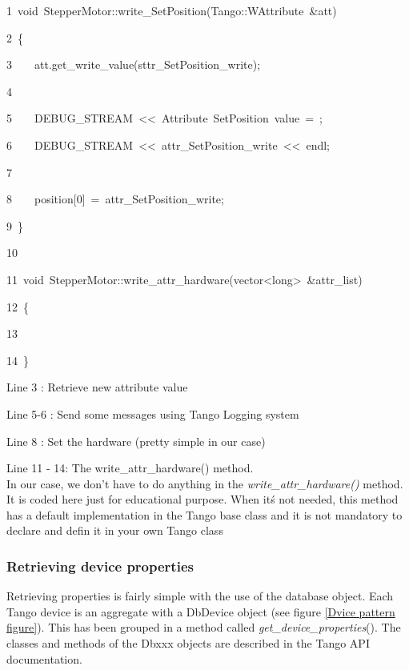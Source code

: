 
\begin{lyxcode}
1~void~StepperMotor::write\_SetPosition(Tango::WAttribute~\&att)

2~\{

3~~~~att.get\_write\_value(sttr\_SetPosition\_write);

4~

5~~~~DEBUG\_STREAM~<\textcompwordmark{}<~\textquotedbl{}Attribute~SetPosition~value~=~\textquotedbl{};

6~~~~DEBUG\_STREAM~<\textcompwordmark{}<~attr\_SetPosition\_write~<\textcompwordmark{}<~endl;

7~

8~~~~position{[}0{]}~=~attr\_SetPosition\_write;

9~\}

10~

11~void~StepperMotor::write\_attr\_hardware(vector<long>~\&attr\_list)

12~\{

13~

14~\}
\end{lyxcode}


Line 3 : Retrieve new attribute value

Line 5-6 : Send some messages using Tango Logging system

Line 8 : Set the hardware (pretty simple in our case)

Line 11 - 14: The write\_attr\_hardware() method. \\


In our case, we don't have to do anything in the \emph{write\_attr\_hardware()}
method. It is coded here just for educational purpose. When it\'{s}
not needed, this method has a default implementation in the Tango
base class and it is not mandatory to declare and defin it in your
own Tango class


\subsubsection{Retrieving device properties}

Retrieving properties is fairly simple with the
use of the database object. Each Tango device is an aggregate with
a DbDevice object (see figure \ref{Dvice pattern figure}). This has
been grouped in a method called \emph{get\_device\_properties}().
The classes and methods of the Dbxxx objects are described in the
Tango API documentation.

